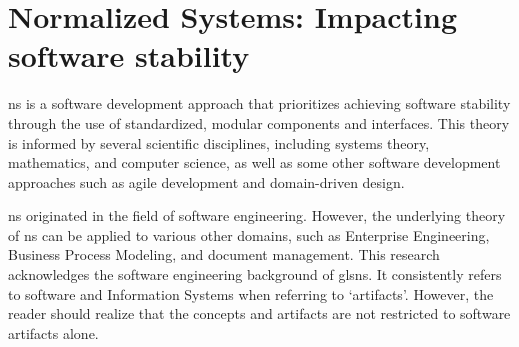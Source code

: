 \section{Normalized Systems: Impacting software stability} \label{ns_theory}

\gls{ns} is a software development approach that prioritizes achieving software stability
through the use of standardized, modular components and interfaces. This theory is
informed by several scientific disciplines, including systems theory, mathematics, and
computer science, as well as some other software development approaches such as agile
development and domain-driven design.

\gls{ns} originated in the field of software engineering. However, the underlying theory
of \gls{ns} can be applied to various other domains, such as Enterprise Engineering,
Business Process Modeling, and document management. This research acknowledges the
software engineering background of gls{ns}. It consistently refers to software and
Information Systems when referring to \enquote*{artifacts}. However, the reader should
realize that the concepts and artifacts are not restricted to software artifacts alone.